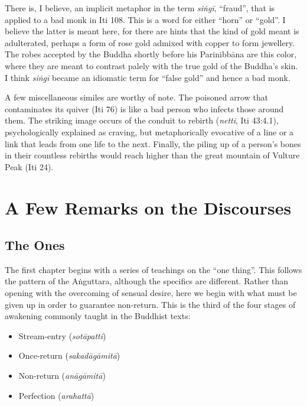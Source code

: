 \documentclass[12pt,openany]{book}%
\begin{document}
There is, I believe, an implicit metaphor in the term \emph{\textsanskrit{siṅgī}}, “fraud”, that is applied to a bad monk in Iti 108. This is a word for either “horn” or “gold”. I believe the latter is meant here, for there are hints that the kind of gold meant is adulterated, perhaps a form of rose gold admixed with copper to form jewellery. The robes accepted by the Buddha shortly before his \textsanskrit{Parinibbāna} are this color, where they are meant to contrast palely with the true gold of the Buddha’s skin. I think \emph{\textsanskrit{siṅgī}} became an idiomatic term for “false gold” and hence a bad monk.

A few miscellaneous similes are worthy of note. The poisoned arrow that contaminates its quiver (Iti 76) is like a bad person who infects those around them. The striking image occurs of the conduit to rebirth (\emph{netti}, Iti 43:4.1), psychologically explained as craving, but metaphorically evocative of a line or a link that leads from one life to the next. Finally, the piling up of a person’s bones in their countless rebirths would reach higher than the great mountain of Vulture Peak (Iti 24).

\section*{A Few Remarks on the Discourses}

\subsection*{The Ones}

The first chapter begins with a series of teachings on the “one thing”. This follows the pattern of the \textsanskrit{Aṅguttara}, although the specifics are different. Rather than opening with the overcoming of sensual desire, here we begin with what must be given up in order to guarantee non-return. This is the third of the four stages of awakening commonly taught in the Buddhist texts:

\begin{itemize}%
\item Stream-entry (\emph{\textsanskrit{sotāpatti}})%
\item Once-return (\emph{\textsanskrit{sakadāgāmitā}})%
\item Non-return (\emph{\textsanskrit{anāgāmitā}})%
\item Perfection (\emph{\textsanskrit{arahattā}})%
\end{itemize}
\end{document}
